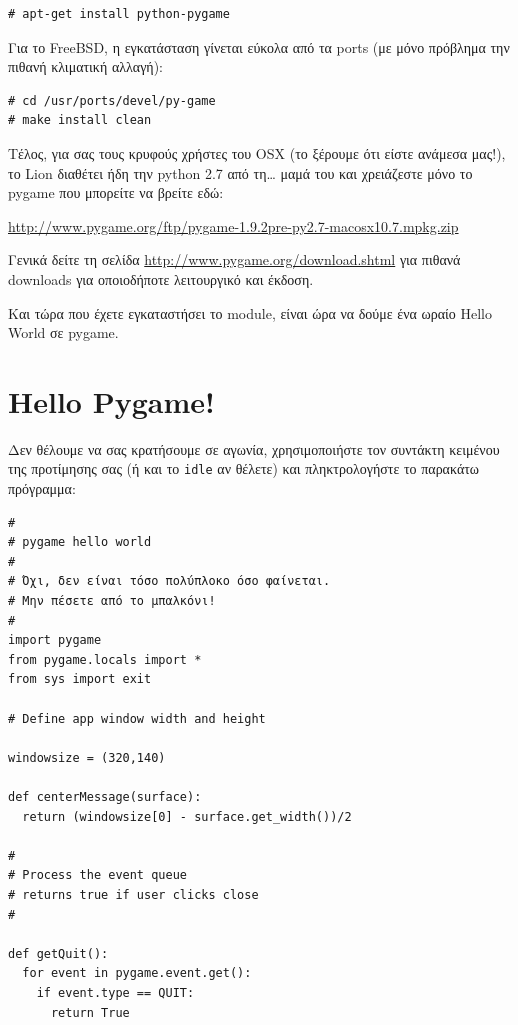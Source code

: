 \begin{verbatim}
# apt-get install python-pygame
\end{verbatim}

Για το FreeBSD, η εγκατάσταση γίνεται εύκολα από τα ports (με μόνο πρόβλημα την πιθανή κλιματική αλλαγή):

\begin{verbatim}
# cd /usr/ports/devel/py-game
# make install clean
\end{verbatim}

Τέλος, για σας τους κρυφούς χρήστες του OSX (το ξέρουμε ότι είστε ανάμεσα μας!), το Lion διαθέτει ήδη την python 2.7 από τη\ldots{} μαμά του και χρειάζεστε μόνο το pygame που μπορείτε να βρείτε εδώ:

\url{http://www.pygame.org/ftp/pygame-1.9.2pre-py2.7-macosx10.7.mpkg.zip}

Γενικά δείτε τη σελίδα \url{http://www.pygame.org/download.shtml} για πιθανά downloads για οποιοδήποτε λειτουργικό και έκδοση.

Και τώρα που έχετε εγκαταστήσει το module, είναι ώρα να δούμε ένα ωραίο Hello World σε pygame.

\section{Hello Pygame!}

Δεν θέλουμε να σας κρατήσουμε σε αγωνία, χρησιμοποιήστε τον συντάκτη κειμένου της προτίμησης σας (ή και το {\tt idle} αν θέλετε) και πληκτρολογήστε το παρακάτω πρόγραμμα:

\begin{verbatim}
#
# pygame hello world
#
# Όχι, δεν είναι τόσο πολύπλοκο όσο φαίνεται.
# Μην πέσετε από το μπαλκόνι!
#
import pygame
from pygame.locals import *
from sys import exit

# Define app window width and height

windowsize = (320,140)

def centerMessage(surface):
  return (windowsize[0] - surface.get_width())/2

#
# Process the event queue
# returns true if user clicks close
#

def getQuit():
  for event in pygame.event.get():
    if event.type == QUIT:
      return True
\end{verbatim}


